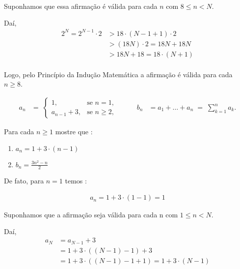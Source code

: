     Suponhamos que essa afirmação é válida para cada $n$ com $8 \leq n < N$.

    Daí,
    \begin{align*}
        2^{N} = 2^{N-1} \cdot 2 &> 18 \cdot (N - 1 + 1) \cdot 2 \\
        &> (18N) \cdot 2 = 18N + 18N \\
        &> 18N + 18 = 18 \cdot (N+1) \\
    \end{align*}

    Logo, pelo Princípio da Indução Matemática a afirmação é válida para cada $n \ge 8$.

    \vspace{0.05cm}

    \begin{exemplo}[: Sequências]
        \begin{equation*}
            \begin{alignedat}{2}
                a_n &=\; \begin{cases}
                    1, & \text{se } n = 1,\\
                    a_{n-1}+3, & \text{se } n \ge 2,
                \end{cases}
                &\qquad
                b_n &= a_1 + \dotsc + a_n \;=\; \sum_{k=1}^{n} a_k.
            \end{alignedat}
    \end{equation*}

        Para cada $n \ge 1$ mostre que :
        \begin{enumerate}[label=\roman*.]
            \item $a_{n} = 1 + 3 \cdot (n-1)$
            \item $b_{n} = \frac{3n^{2} - n}{2}$
        \end{enumerate}
        
    \end{exemplo}

    De fato, para $n = 1$ temos :

    \begin{align*}
    a_n = 1 + 3 \cdot (1 - 1) = 1
    \end{align*}

    Suponhamos que a afirmação seja válida para cada n com $1 \leq n < N$.

    Daí,
    \begin{align*}
    a_{N} &= a_{N-1} + 3 \\
    &= 1 + 3 \cdot ((N-1) - 1) + 3 \\
    &= 1 + 3 \cdot ((N-1) - 1 + 1) = 1 + 3 \cdot (N - 1) 
    \end{align*}


